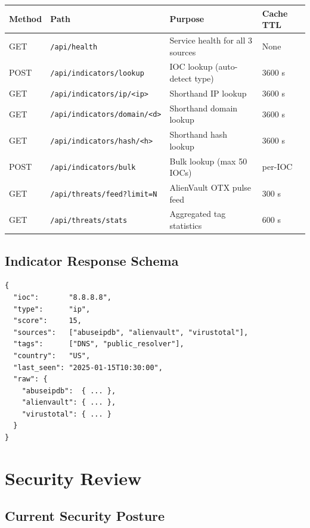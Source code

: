 \documentclass[11pt,a4paper]{article}
\begin{document}
\begin{center}
\begin{tabularx}{\textwidth}{llXl}
\toprule
\textbf{Method} & \textbf{Path} & \textbf{Purpose} & \textbf{Cache TTL} \\
\midrule
GET  & \texttt{/api/health}                  & Service health for all 3 sources & None \\
POST & \texttt{/api/indicators/lookup}        & IOC lookup (auto-detect type) & 3600 s \\
GET  & \texttt{/api/indicators/ip/<ip>}       & Shorthand IP lookup & 3600 s \\
GET  & \texttt{/api/indicators/domain/<d>}    & Shorthand domain lookup & 3600 s \\
GET  & \texttt{/api/indicators/hash/<h>}      & Shorthand hash lookup & 3600 s \\
POST & \texttt{/api/indicators/bulk}          & Bulk lookup (max 50 IOCs) & per-IOC \\
GET  & \texttt{/api/threats/feed?limit=N}     & AlienVault OTX pulse feed & 300 s \\
GET  & \texttt{/api/threats/stats}            & Aggregated tag statistics & 600 s \\
\bottomrule
\end{tabularx}
\end{center}

\subsection{Indicator Response Schema}

\begin{lstlisting}[caption={Indicator JSON returned by all lookup endpoints}]
{
  "ioc":       "8.8.8.8",
  "type":      "ip",
  "score":     15,
  "sources":   ["abuseipdb", "alienvault", "virustotal"],
  "tags":      ["DNS", "public_resolver"],
  "country":   "US",
  "last_seen": "2025-01-15T10:30:00",
  "raw": {
    "abuseipdb":  { ... },
    "alienvault": { ... },
    "virustotal": { ... }
  }
}
\end{lstlisting}

\newpage

\section{Security Review}

\subsection{Current Security Posture}
\end{document}
